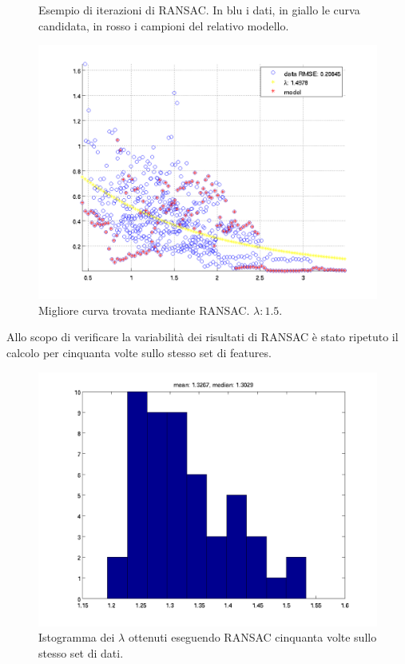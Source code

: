 \documentclass[12pt]{report}
\begin{document}
\begin{figure}[H]
\begin{minipage}[t]{0.5\linewidth}
\end{minipage}
\caption[short]{Esempio di iterazioni di RANSAC. In blu i dati, in giallo le curva candidata, in rosso i campioni del relativo modello.}
\label{fig:ransac2}
\end{figure}

\begin{figure}[H]
	\centering
	\includegraphics[scale=.7]{images/ransacWin}
	\caption{Migliore curva trovata mediante RANSAC. $\lambda: 1.5$.}
	\label{fig:ransacWin}
\end{figure}

\noindent Allo scopo di verificare la variabilit\`a dei risultati di RANSAC \`e stato ripetuto il calcolo per cinquanta volte sullo stesso set di features.

\begin{figure}[H]
	\centering
	\includegraphics[scale=.6]{images/multiRansac}
	\caption{Istogramma dei $\lambda$ ottenuti eseguendo RANSAC cinquanta volte sullo stesso set di dati.}
	\label{fig:multiRansac}
\end{figure}
\end{document}
